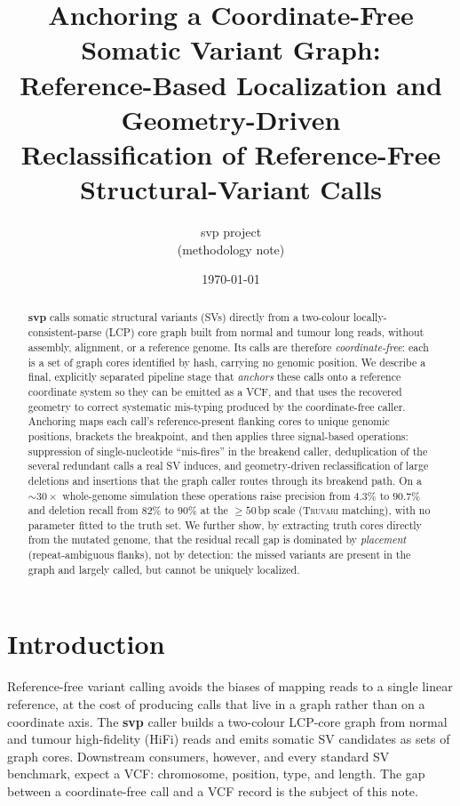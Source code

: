 \documentclass[11pt]{article}
\title{\bfseries Anchoring a Coordinate-Free Somatic Variant Graph:\\
Reference-Based Localization and Geometry-Driven\\ Reclassification of Reference-Free Structural-Variant Calls}
\author{svp project \\ \small (methodology note)}
\date{\today}
\begin{document}
\maketitle

\begin{abstract}
\noindent
\textbf{svp} calls somatic structural variants (SVs) directly from a two-colour
locally-consistent-parse (LCP) core graph built from normal and tumour long reads, without
assembly, alignment, or a reference genome. Its calls are therefore \emph{coordinate-free}:
each is a set of graph cores identified by hash, carrying no genomic position. We describe a
final, explicitly separated pipeline stage that \emph{anchors} these calls onto a reference
coordinate system so they can be emitted as a VCF, and that uses the recovered geometry to
correct systematic mis-typing produced by the coordinate-free caller. Anchoring maps each
call's reference-present flanking cores to unique genomic positions, brackets the breakpoint,
and then applies three signal-based operations: suppression of single-nucleotide ``mis-fires''
in the breakend caller, deduplication of the several redundant calls a real SV induces, and
geometry-driven reclassification of large deletions and insertions that the graph caller routes
through its breakend path. On a $\sim\!30\times$ whole-genome simulation these operations raise
precision from $4.3\%$ to $90.7\%$ and deletion recall from $82\%$ to $90\%$ at the
$\geq 50$\,bp scale (\textsc{Truvari} matching), with no parameter fitted to the truth set. We
further show, by extracting truth cores directly from the mutated genome, that the residual
recall gap is dominated by \emph{placement} (repeat-ambiguous flanks), not by detection: the
missed variants are present in the graph and largely called, but cannot be uniquely localized.
\end{abstract}

\section{Introduction}

Reference-free variant calling avoids the biases of mapping reads to a single linear reference,
at the cost of producing calls that live in a graph rather than on a coordinate axis. The
\textbf{svp} caller builds a two-colour LCP-core graph from normal and tumour high-fidelity (HiFi)
reads and emits somatic SV candidates as sets of graph cores. Downstream consumers, however, and
every standard SV benchmark, expect a VCF: chromosome, position, type, and length. The gap between
a coordinate-free call and a VCF record is the subject of this note.
\end{document}
